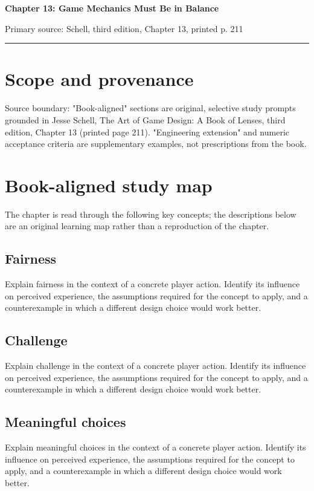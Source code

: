 \documentclass[11pt]{article}
\begin{document}
{\huge\bfseries\color{suiteblue} Chapter 13: Game Mechanics Must Be in Balance}\par
\vspace{0.15in}
{\normalsize\color{suitegray} Primary source: Schell, third edition, Chapter 13, printed p. 211}\par
\vspace{0.15in}\hrule\vspace{0.15in}

\section{Scope and provenance}
Source boundary: "Book-aligned" sections are original, selective study prompts grounded in Jesse Schell, The Art of Game Design: A Book of Lenses, third edition, Chapter 13 (printed page 211). "Engineering extension" and numeric acceptance criteria are supplementary examples, not prescriptions from the book.


\section{Book-aligned study map}
The chapter is read through the following key concepts; the descriptions below are an original learning map rather than a reproduction of the chapter.


\subsection{Fairness}
Explain fairness in the context of a concrete player action. Identify its influence on perceived experience, the assumptions required for the concept to apply, and a counterexample in which a different design choice would work better.


\subsection{Challenge}
Explain challenge in the context of a concrete player action. Identify its influence on perceived experience, the assumptions required for the concept to apply, and a counterexample in which a different design choice would work better.


\subsection{Meaningful choices}
Explain meaningful choices in the context of a concrete player action. Identify its influence on perceived experience, the assumptions required for the concept to apply, and a counterexample in which a different design choice would work better.
\end{document}

